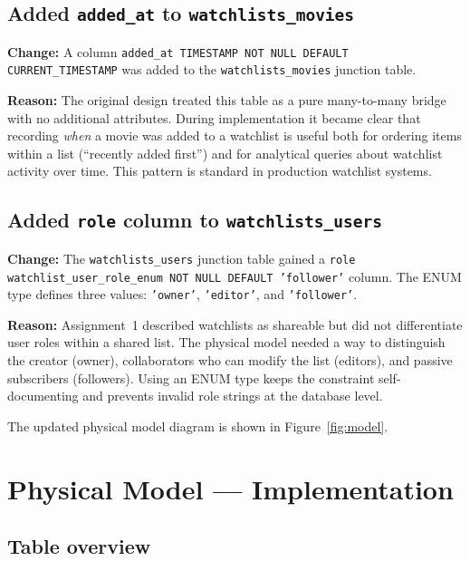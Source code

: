 \documentclass[11pt, a4paper]{article}
\begin{document}
\subsection{Added \texttt{added\_at} to \texttt{watchlists\_movies}}

\noindent\textbf{Change:} A column \texttt{added\_at TIMESTAMP NOT NULL
DEFAULT CURRENT\_TIMESTAMP} was added to the \texttt{watchlists\_movies}
junction table.

\noindent\textbf{Reason:} The original design treated this table as a pure
many-to-many bridge with no additional attributes. During implementation it
became clear that recording \emph{when} a movie was added to a watchlist is
useful both for ordering items within a list (``recently added first'') and
for analytical queries about watchlist activity over time. This pattern is
standard in production watchlist systems.

\subsection{Added \texttt{role} column to \texttt{watchlists\_users}}

\noindent\textbf{Change:} The \texttt{watchlists\_users} junction table
gained a \texttt{role watchlist\_user\_role\_enum NOT NULL DEFAULT
'follower'} column. The ENUM type defines three values:
\texttt{'owner'}, \texttt{'editor'}, and \texttt{'follower'}.

\noindent\textbf{Reason:} Assignment~1 described watchlists as shareable
but did not differentiate user roles within a shared list. The physical
model needed a way to distinguish the creator (owner), collaborators who can
modify the list (editors), and passive subscribers (followers). Using an
ENUM type keeps the constraint self-documenting and prevents invalid role
strings at the database level.

\noindent The updated physical model diagram is shown in
Figure~\ref{fig:model}.

\newpage
\section{Physical Model --- Implementation}
\label{sec:physical}

\subsection{Table overview}
\end{document}
